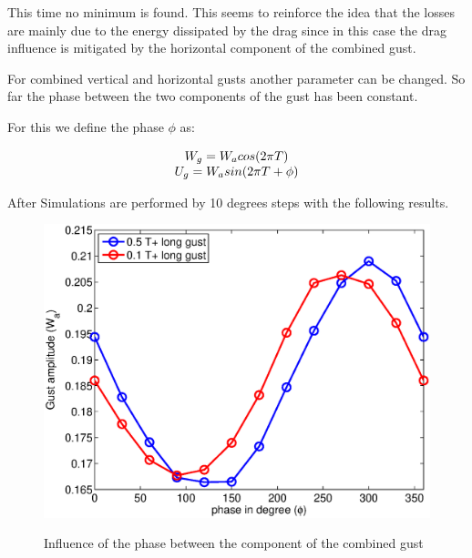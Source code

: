 \par This time no minimum is found.
This seems to reinforce the idea that the losses are mainly due to the energy dissipated by the drag since in this case the drag influence is mitigated by the horizontal component of the combined gust.


For combined vertical and horizontal gusts another parameter can be changed.
So far the phase between the two components of the gust has been constant.

\par For this we define the phase $\phi$ as:

\begin{equation}
  \begin{array}[c]{c}
    W_g=W_a cos(2\pi T) \\
    U_g=W_a sin(2\pi T + \phi)
  \end{array}
  \label{eqn:combined_gust_phase}
\end{equation}

After Simulations are performed by 10 degrees steps with the following results.

\begin{figure}[ht]
  \begin{center}
    \scalebox{0.8}
    {\includegraphics{./Figures/combined_gust_amplitude_vs_phase.eps}}
  \end{center}
  \caption{Influence of the phase between the component of the combined gust}
  \label{fig:combined_amplitude_phase}
\end{figure}

